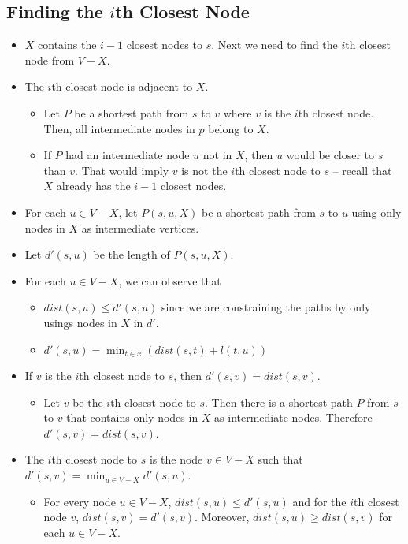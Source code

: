 \subsection{Finding the $i$th Closest Node}
\begin{itemize}
    \item $X$ contains the $i - 1$ closest nodes to $s$. Next we need to find the $i$th closest node from $V - X$.
    \item The $i$th closest node is adjacent to $X$.
    \begin{itemize}
        \item Let $P$ be a shortest path from $s$ to $v$ where $v$ is the $i$th closest node. Then, all intermediate nodes in $p$ belong to $X$.
        \item If $P$ had an intermediate node $u$ not in $X$, then $u$ would be closer to $s$ than $v$. That would imply $v$ is not the $i$th closest node to $s$ -- recall that $X$ already has the $i - 1$ closest nodes.
    \end{itemize}
    \item For each $u \in V - X$, let $P(s, u, X)$ be a shortest path from $s$ to $u$ using only nodes in $X$ as intermediate vertices.
    \item Let $d'(s, u)$ be the length of $P(s, u, X)$.
    \item For each $u \in V - X$, we can observe that
    \begin{itemize}
        \item $dist(s, u) \leq d'(s, u)$ since we are constraining the paths by only usings nodes in $X$ in $d'$.
        \item $d'(s, u) = \min_{t \in x}(dist(s, t) + l(t, u))$
    \end{itemize}
    \item If $v$ is the $i$th closest node to $s$, then $d'(s, v) = dist(s, v)$.
    \begin{itemize}
        \item Let $v$ be the $i$th closest node to $s$. Then there is a shortest path $P$ from $s$ to $v$ that contains only nodes in $X$ as intermediate nodes. Therefore $d'(s, v) = dist(s, v)$.
    \end{itemize}
    \item The $i$th closest node to $s$ is the node $v \in V - X$ such that $d'(s, v) = \min_{u \in V - X}d'(s, u)$.
    \begin{itemize}
        \item For every node $u \in V - X$, $dist(s, u) \leq d'(s, u)$ and for the $i$th closest node $v$, $dist(s, v) = d'(s, v)$. Moreover, $dist(s, u) \geq dist(s, v)$ for each $u \in V - X$.

\end{itemize}
\end{itemize}

